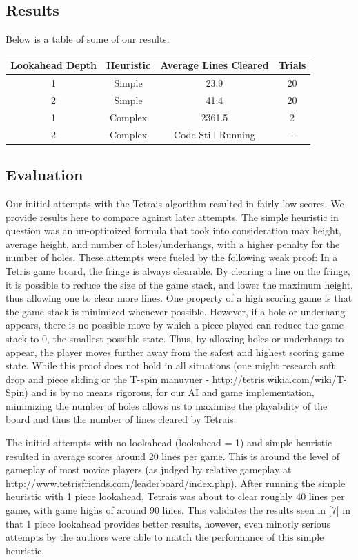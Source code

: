 \documentclass[12pt]{article}
\begin{document}
\subsection{Results}
Below is a table of some of our results:\vspace{2em}

\begin{tabular}{|c|c|c|c|}\hline
Lookahead Depth & Heuristic & Average Lines Cleared & Trials\\ \hline
1 & Simple & 23.9 & 20\\ \hline
2 & Simple & 41.4 & 20\\ \hline
1 & Complex & 2361.5 & 2\\ \hline
2 & Complex & Code Still Running & -\\ \hline
\end{tabular}

\subsection{Evaluation}
Our initial attempts with the Tetrais algorithm resulted in fairly low scores. We provide results here to compare against later attempts. The simple heuristic in question was an un-optimized formula that took into consideration max height, average height, and number of holes/underhangs, with a higher penalty for the number of holes. These attempts were fueled by the following weak proof: In a Tetris game board, the fringe is always clearable. By clearing a line on the fringe, it is possible to reduce the size of the game stack, and lower the maximum height, thus allowing one to clear more lines. One property of a high scoring game is that the game stack is minimized whenever possible. However, if a hole or underhang appears, there is no possible move by which a piece played can reduce the game stack to 0, the smallest possible state. Thus, by allowing holes or underhangs to appear, the player moves further away from the safest and highest scoring game state. While this proof does not hold in all situations (one might research soft drop and piece sliding or the T-spin manuvuer - \url{http://tetris.wikia.com/wiki/T-Spin}) and is by no means rigorous, for our AI and game implementation, minimizing the number of holes allows us to maximize the playability of the board and thus the number of lines cleared by Tetrais.

The initial attempts with no lookahead (lookahead = 1) and simple heuristic resulted in average scores around 20 lines per game. This is around the level of gameplay of most novice players (as judged by relative gameplay at \url{http://www.tetrisfriends.com/leaderboard/index.php}). After running the simple heuristic with 1 piece lookahead, Tetrais was about to clear roughly 40 lines per game, with game highs of around 90 lines. This validates the results seen in [7] in that 1 piece lookahead provides better results, however, even minorly serious attempts by the authors were able to match the performance of this simple heuristic. 
\end{document}
